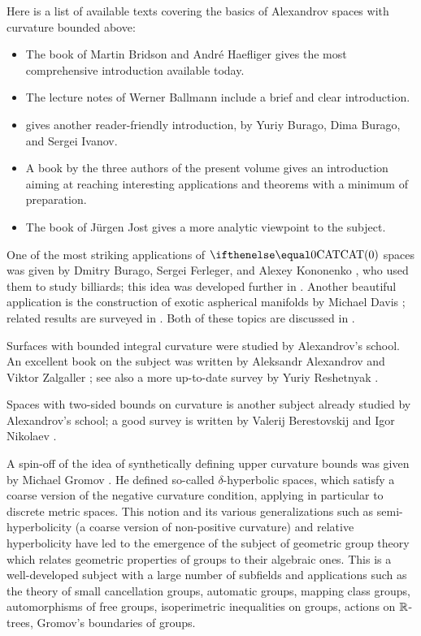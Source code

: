Here is a list of available texts covering the basics of Alexandrov spaces with curvature bounded above: 
\begin{itemize}
\item The book of Martin Bridson and Andr\'e Haefliger \cite{bridson-haefliger} gives the most comprehensive introduction available today. 
\item The lecture notes of Werner Ballmann \cite{ballmann:lectures, ballmann:notes} include a brief 
and clear
introduction.
\item \cite[Chapter 9]{burago-burago-ivanov} gives another reader-friendly introduction, by Yuriy Burago, Dima Burago, and Sergei Ivanov.
\item A book  by the three authors of the present volume  \cite{alexander-kapovitch-petrunin-CAT} gives an introduction aiming at reaching interesting applications and theorems with a minimum of preparation.
\item The book of J\"{u}rgen Jost \cite{jost:book} gives a more analytic viewpoint to the subject.
\end{itemize}

One of the most striking applications of $\CAT0$ spaces was given by Dmitry Burago, Sergei Ferleger, and Alexey Kononenko \cite{burago-ferleger-kononenko1998-1},
who used them to study billiards; this idea was developed further in \cite{burago-ferleger-kononenko1998-2,burago-ferleger-kononenko1998-3,burago-ferleger-kononenko1998-4,burago-ferleger-kononenko2000,burago-ferleger-kononenko2001}. 
Another beautiful application is the construction of exotic aspherical manifolds by Michael Davis \cite{davis:aspherical}; related results are surveyed in \cite{davis:exotic,charney-davis-1995}.
Both of these topics are discussed in \cite{alexander-kapovitch-petrunin-CAT}.

Surfaces with bounded integral curvature were studied by Alexandrov's school.
An excellent book on the subject was written by Aleksandr Alexandrov and Viktor Zalgaller \cite{aleksandrov-zalgaller}; see also a more up-to-date survey by Yuriy Reshetnyak \cite{reshetnyak:2D}.

Spaces with two-sided bounds on curvature is another subject already studied  by Alexandrov's school;
a good survey is written by Valerij Berestovskij and Igor Nikolaev \cite{berestovskii-nikolaev}.

A spin-off of the idea of synthetically defining upper curvature bounds 
was given by Michael Gromov \cite{gromov:hyp-groups}. 
He  defined so-called  $\delta$-hyperbolic spaces, which satisfy   a coarse version of the  negative curvature condition, applying  in particular to discrete metric spaces.
This notion and its various generalizations such as semi-hyperbolicity (a coarse version of non-positive curvature) and relative hyperbolicity have  led to the emergence of the subject of geometric group theory which relates geometric properties of groups to their algebraic ones.
This is a well-developed subject with a large number of subfields and applications such as the theory of small cancellation groups, automatic groups,  mapping class groups, automorphisms of free groups, isoperimetric inequalities on groups, actions on $\mathbb{R}$-trees, Gromov's boundaries of groups.

